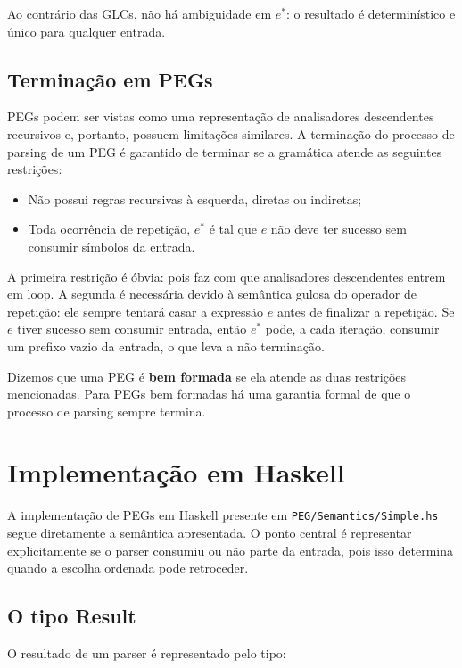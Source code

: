 Ao contrário das GLCs, não há ambiguidade em \(e^*\): o resultado é
determinístico e único para qualquer entrada.

\subsection{Terminação em PEGs}

PEGs podem ser vistas como uma representação de analisadores
descendentes recursivos e, portanto, possuem limitações similares. A
terminação do processo de parsing de um PEG é garantido de terminar
se a gramática atende as seguintes restrições:

\begin{itemize}
  \item
    Não possui regras recursivas à esquerda, diretas ou indiretas;
  \item
    Toda ocorrência de repetição, \(e^*\) é tal que \(e\) não deve
    ter sucesso sem consumir símbolos da entrada.
\end{itemize}

A primeira restrição é óbvia: pois faz com que analisadores
descendentes entrem em loop. A segunda é necessária devido à
semântica gulosa do operador de repetição: ele sempre tentará casar a
expressão \(e\) antes de finalizar a repetição. Se \(e\) tiver
sucesso sem consumir entrada, então \(e^*\) pode, a cada iteração,
consumir um prefixo vazio da entrada, o que leva a não terminação.

Dizemos que uma PEG é \textbf{bem formada} se ela atende as duas
restrições mencionadas. Para PEGs bem formadas há uma garantia formal
de que o processo de parsing sempre termina.

\section{Implementação em Haskell}

A implementação de PEGs em Haskell presente em
\verb|PEG/Semantics/Simple.hs| segue diretamente a
semântica apresentada. O ponto central é representar explicitamente
se o parser consumiu ou não parte da entrada, pois isso determina
quando a escolha ordenada pode retroceder.

\subsection{O tipo Result}

O resultado de um parser é representado pelo tipo:

